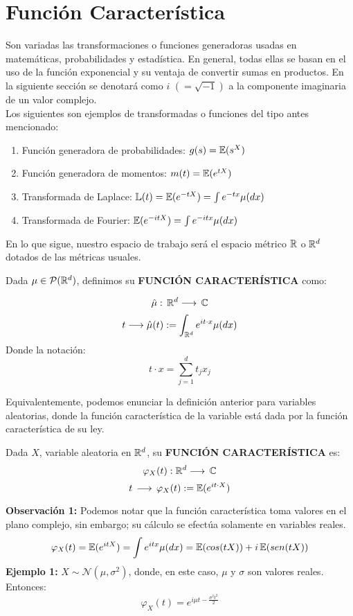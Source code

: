 \section{Función Característica}

\hspace{3.5mm}Son variadas las transformaciones o funciones generadoras usadas en matemáticas, probabilidades y estadística. En general, todas ellas se basan en el uso de la función exponencial y su ventaja de convertir sumas en productos. En la siguiente sección se denotará como $i$ $(=\sqrt{-1})$ a la componente imaginaria de un valor complejo.\\

Los siguientes son ejemplos de transformadas o funciones del tipo antes mencionado:
\begin{enumerate}
    \item Función generadora de probabilidades: $g(s)=\mathbb E(s^{X})$
    \item Función generadora de momentos: $m(t) = \mathbb E(e^{tX})$
    \item Transformada de Laplace: $\mathbb{L}(t) = \mathbb E(e^{-tX}) = \int e^{-tx}\mu(dx)$
    \item Transformada de Fourier: $\mathbb E(e^{-itX}) = \int e^{-itx}\mu(dx)$
\end{enumerate}

En lo que sigue, nuestro espacio de trabajo será el espacio métrico $\mathbb R$ o $\mathbb R^{d}$ dotados de las métricas usuales.

\begin{definicion} Dada $\mu \in \mathcal{P}(\mathbb R^{d})$, definimos su \textbf{FUNCIÓN CARACTERÍSTICA} como:

    \[\hat{\mu}:\,\mathbb R^{d} \longrightarrow\,\mathbb C\]
    \begin{equation}
    t \longrightarrow \hat{\mu}(t) := \int_{\mathbb R^d} e^{it\cdot x}\mu(dx)
\end{equation}
Donde la notación:
\[t\cdot x = \sum_{j=1}^{d}t_j x_j\]
\end{definicion}

Equivalentemente, podemos enunciar la definición anterior para variables aleatorias, donde la función característica de la variable está dada por la función característica de su ley.

\begin{definicion} Dada $X$, variable aleatoria en $\mathbb R^d$, su \textbf{FUNCIÓN CARACTERÍSTICA} es:
\[\varphi_X(t):\mathbb R^d \longrightarrow\,\mathbb C\]
\begin{equation}
    t \,\longrightarrow\,\varphi_X(t) := \mathbb E(e^{it \cdot X})
\end{equation}
\end{definicion}
\textbf{Observación 1:} Podemos notar que la función característica toma valores en el plano complejo, sin embargo; su cálculo se efectúa solamente en variables reales.
\[\varphi_X(t) = \mathbb E(e^{itX}) = \int e^{itx}\mu(dx) = \mathbb E(cos(tX)) + i\,\mathbb E(sen(tX))\]
\textbf{Ejemplo 1:} $X\sim \mathcal{N}(\mu,\sigma^{2})$, donde, en este caso, $\mu$ y $\sigma$ son valores reales. Entonces:
 \[\varphi_X(t) = e^{i\mu t -\frac{\sigma^2 t^2}{2}}\]

